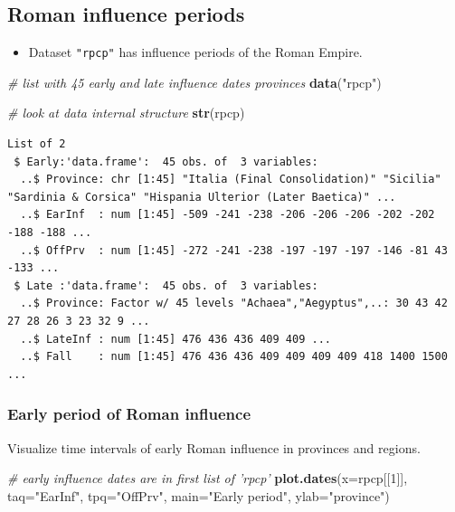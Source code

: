 \documentclass[a4paper,11pt]{memoir}
\newenvironment{Shaded}{\begin{snugshade}}{\end{snugshade}}
\newcommand{\CommentTok}[1]{\textcolor[rgb]{0.56,0.35,0.01}{\textit{#1}}}
\newcommand{\DataTypeTok}[1]{\textcolor[rgb]{0.13,0.29,0.53}{#1}}
\newcommand{\DecValTok}[1]{\textcolor[rgb]{0.00,0.00,0.81}{#1}}
\newcommand{\KeywordTok}[1]{\textcolor[rgb]{0.13,0.29,0.53}{\textbf{#1}}}
\newcommand{\NormalTok}[1]{#1}
\newcommand{\StringTok}[1]{\textcolor[rgb]{0.31,0.60,0.02}{#1}}
\providecommand{\tightlist}{%
  \setlength{\itemsep}{0pt}\setlength{\parskip}{0pt}}
\begin{document}
\hypertarget{roman-influence-periods}{%
\subsection{Roman influence periods}\label{roman-influence-periods}}

\begin{itemize}
\tightlist
\item
  Dataset \texttt{"rpcp"} has influence periods of the Roman Empire.
\end{itemize}

\begin{Shaded}
\begin{Highlighting}[]
\CommentTok{# list with 45 early and late influence dates provinces}
\KeywordTok{data}\NormalTok{(}\StringTok{"rpcp"}\NormalTok{)}
\end{Highlighting}
\end{Shaded}

\begin{Shaded}
\begin{Highlighting}[]
\CommentTok{# look at data internal structure}
\KeywordTok{str}\NormalTok{(rpcp)}
\end{Highlighting}
\end{Shaded}

\begin{verbatim}
List of 2
 $ Early:'data.frame':  45 obs. of  3 variables:
  ..$ Province: chr [1:45] "Italia (Final Consolidation)" "Sicilia" "Sardinia & Corsica" "Hispania Ulterior (Later Baetica)" ...
  ..$ EarInf  : num [1:45] -509 -241 -238 -206 -206 -206 -202 -202 -188 -188 ...
  ..$ OffPrv  : num [1:45] -272 -241 -238 -197 -197 -197 -146 -81 43 -133 ...
 $ Late :'data.frame':  45 obs. of  3 variables:
  ..$ Province: Factor w/ 45 levels "Achaea","Aegyptus",..: 30 43 42 27 28 26 3 23 32 9 ...
  ..$ LateInf : num [1:45] 476 436 436 409 409 ...
  ..$ Fall    : num [1:45] 476 436 436 409 409 409 409 418 1400 1500 ...
\end{verbatim}

\hypertarget{early-period-of-roman-influence}{%
\subsubsection{Early period of Roman
influence}\label{early-period-of-roman-influence}}

Visualize time intervals of early Roman influence in provinces and
regions.

\begin{Shaded}
\begin{Highlighting}[]
\CommentTok{# early influence dates are in first list of 'rpcp'}
\KeywordTok{plot.dates}\NormalTok{(}\DataTypeTok{x=}\NormalTok{rpcp[[}\DecValTok{1}\NormalTok{]], }\DataTypeTok{taq=}\StringTok{"EarInf"}\NormalTok{, }\DataTypeTok{tpq=}\StringTok{"OffPrv"}\NormalTok{, }\DataTypeTok{main=}\StringTok{"Early period"}\NormalTok{, }\DataTypeTok{ylab=}\StringTok{"province"}\NormalTok{)}
\end{Highlighting}
\end{Shaded}
\end{document}
